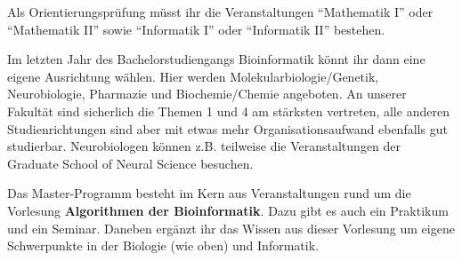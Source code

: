 Als Orientierungsprüfung müsst ihr die Veranstaltungen "`Mathematik I"' oder "`Mathematik II"' sowie "`Informatik I"' oder "`Informatik II"' bestehen.

Im letzten Jahr des Bachelorstudiengangs Bioinformatik könnt ihr dann eine eigene Ausrichtung wählen.
Hier werden Molekularbiologie/Genetik, Neurobiologie, Pharmazie und Biochemie/Chemie angeboten. An
unserer Fakultät sind sicherlich die Themen 1 und 4 am stärksten vertreten, alle anderen
Studienrichtungen sind aber mit etwas mehr Organisationsaufwand ebenfalls gut studierbar. Neurobiologen
können z.B. teilweise die Veranstaltungen der Graduate School of Neural Science besuchen.

Das Master-Programm besteht im Kern aus Veranstaltungen rund um die Vorlesung \textbf{Algorithmen der
Bioinformatik}. Dazu gibt es auch ein Praktikum und ein Seminar. Daneben ergänzt ihr das Wissen aus
dieser Vorlesung um eigene Schwerpunkte in der Biologie (wie oben) und Informatik.




